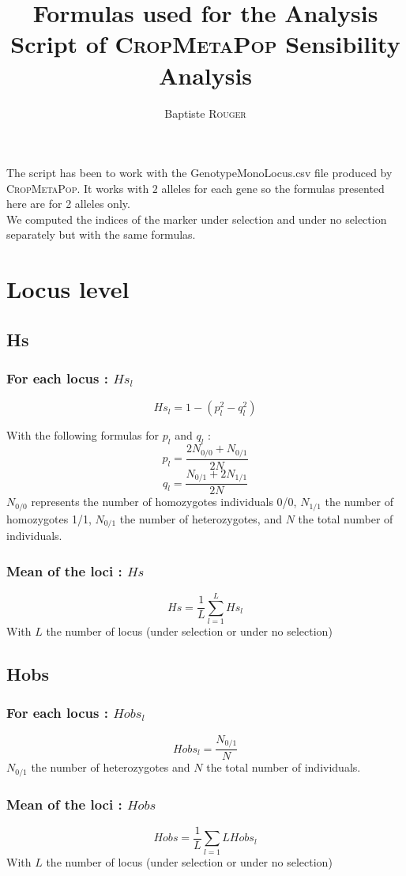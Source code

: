 \documentclass[10pt,a4paper]{article}
\title{Formulas used for the Analysis Script of \textsc{CropMetaPop} Sensibility Analysis}
\author{Baptiste \textsc{Rouger}}
\begin{document}
\maketitle

The script has been to work with the GenotypeMonoLocus.csv file produced by \textsc{CropMetaPop}. It works with $2$ alleles for each gene so the formulas presented here are for 2 alleles only.\\
We computed the indices of the marker under selection and under no selection separately but with the same formulas.

\section{Locus level}
\subsection{Hs}
\subsubsection{For each locus : $Hs_l$}
\[ Hs_l = 1 - (p_l^2 - q_l^2) \]

With the following formulas for $p_l$ and $q_l$ :
\[ p_l = \frac{2N_{0/0} + N_{0/1}}{2N}\]
\[ q_l = \frac{N_{0/1} + 2N_{1/1}}{2N}\]
$N_{0/0}$ represents the number of homozygotes individuals 0/0, $N_{1/1}$ the number of homozygotes 1/1, $N_{0/1}$ the number of heterozygotes, and $N$ the total number of individuals.
\subsubsection{Mean of the loci : $Hs$}
\[ Hs = \frac{1}{L}\sum_{l=1}^{L} Hs_l \]
With $L$ the number of locus (under selection or under no selection)

\subsection{Hobs}
\subsubsection{For each locus : $Hobs_l$}
\[ Hobs_l = \frac{ N_{0/1} }{N} \]
$N_{0/1}$ the number of heterozygotes and $N$ the total number of individuals.
\subsubsection{Mean of the loci : $Hobs$}
\[ Hobs = \frac{1}{L}\sum_{l=1}{L} Hobs_l\]
With $L$ the number of locus (under selection or under no selection)
\end{document}
